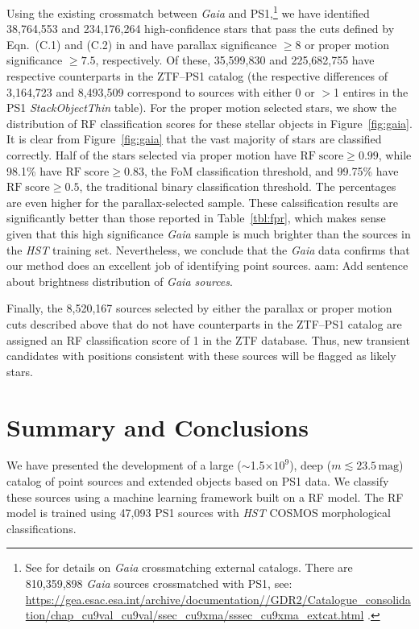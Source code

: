 \documentclass[twocolumn]{aastex62}
\newcommand{\aam}[1]{{\color{blue} aam: {#1}}}
\begin{document}
\begin{CJK*}{UTF8}{gbsn}
Using the existing crossmatch between \textit{Gaia} and PS1,\footnote{See
\citet{Marrese17} for details on \textit{Gaia} crossmatching external
catalogs. There are 810,359,898 \textit{Gaia} sources crossmatched with PS1,
see:
%
\url{https://gea.esac.esa.int/archive/documentation//GDR2/Catalogue_consolidation/chap_cu9val_cu9val/ssec_cu9xma/sssec_cu9xma_extcat.html}
%
.} we have identified 38,764,553 and 234,176,264 high-confidence stars that
pass the cuts defined by Eqn.~(C.1) and (C.2) in \citet{Lindegren18} and
have parallax significance $\ge 8$ or proper motion significance $\ge 7.5$,
respectively. Of these, 35,599,830 and 225,682,755 have respective
counterparts in the ZTF--PS1 catalog (the respective differences of
3,164,723 and 8,493,509 correspond to sources with either 0 or $>$1 entires
in the PS1 \textit{StackObjectThin} table). For the proper motion selected
stars, we show the distribution of RF classification scores for these
stellar objects in Figure~\ref{fig:gaia}. It is clear from
Figure~\ref{fig:gaia} that the vast majority of stars are classified
correctly. Half of the stars selected via proper motion have
$\mathrm{RF\;score}\ge 0.99$, while 98.1\% have $\mathrm{RF\;score}\ge
0.83$, the FoM classification threshold, and 99.75\% have
$\mathrm{RF\;score}\ge 0.5$, the traditional binary classification
threshold. The percentages are even higher for the parallax-selected sample.
These calssification results are significantly better than those reported in
Table~\ref{tbl:fpr}, which makes sense given that this high significance
\textit{Gaia} sample is much brighter than the sources in the \textit{HST}
training set. Nevertheless, we conclude that the \textit{Gaia} data confirms
that our method does an excellent job of identifying point sources.
\aam{Add sentence about brightness distribution of \textit{Gaia sources}.}

Finally, the 8,520,167 sources selected by either the parallax or proper
motion cuts described above that do not have counterparts in the ZTF--PS1
catalog are assigned an RF classification score of 1 in the ZTF database.
Thus, new transient candidates with positions consistent with these sources
will be flagged as likely stars.

\section{Summary and Conclusions}

We have presented the development of a large ($\sim$1.5$\times 10^{9}$),
deep ($m \lesssim 23.5\,\mathrm{mag}$) catalog of point sources and extended
objects based on PS1 data. We classify these sources using a machine
learning framework built on a RF model. The RF model is trained using 47,093
PS1 sources with \textit{HST} COSMOS morphological classifications.


\end{CJK*}
\end{document}
